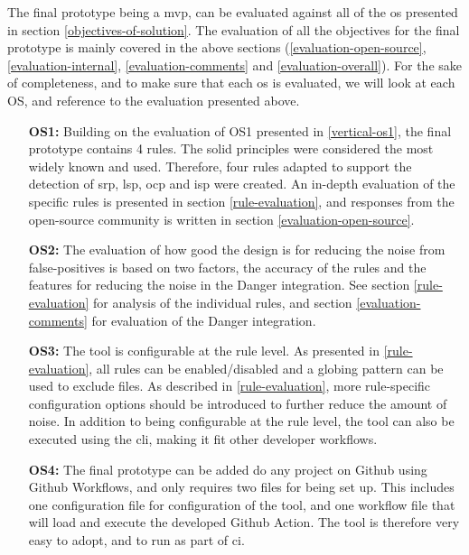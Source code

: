 \documentclass{report}
\begin{document}
The final prototype being a \gls{mvp}, can be evaluated against all of the \gls{os} presented in section \ref{objectives-of-solution}. The evaluation of all the objectives for the final prototype is mainly covered in the above sections (\ref{evaluation-open-source}, \ref{evaluation-internal}, \ref{evaluation-comments} and \ref{evaluation-overall}). For the sake of completeness, and to make sure that each \gls{os} is evaluated, we will look at each OS, and reference to the evaluation presented above. 



\begin{itemize}
    \item [\textbf{OS1:}] Building on the evaluation of OS1 presented in \ref{vertical-os1}, the final prototype contains 4 rules. The \gls{solid} principles were considered the most widely known and used. Therefore, four rules adapted to support the detection of \gls{srp}, \gls{lsp}, \gls{ocp} and \gls{isp} were created. An in-depth evaluation of the specific rules is presented in section \ref{rule-evaluation}, and responses from the open-source community is written in section \ref{evaluation-open-source}. 
    
    \item [\textbf{OS2:}] The evaluation of how good the design is for reducing the noise from false-positives is based on two factors, the accuracy of the rules and the features for reducing the noise in the Danger integration. See section \ref{rule-evaluation} for analysis of the individual rules, and section \ref{evaluation-comments} for evaluation of the Danger integration. 
    
    \item [\textbf{OS3:}] The tool is configurable at the rule level. As presented in \ref{rule-evaluation}, all rules can be enabled/disabled and a globing pattern can be used to exclude files. As described in \ref{rule-evaluation}, more rule-specific configuration options should be introduced to further reduce the amount of noise. In addition to being configurable at the rule level, the tool can also be executed using the \gls{cli}, making it fit other developer workflows. 
    
    \item [\textbf{OS4:}] The final prototype can be added do any project on Github using Github Workflows, and only requires two files for being set up. This includes one configuration file for configuration of the tool, and one workflow file that will load and execute the developed Github Action. The tool is therefore very easy to adopt, and to run as part of \gls{ci}.
    

\end{itemize}
\end{document}
